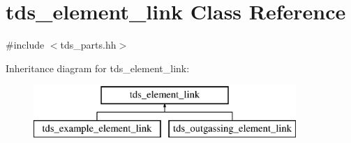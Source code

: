 \hypertarget{classtds__element__link}{\section{tds\-\_\-element\-\_\-link Class Reference}
\label{classtds__element__link}
}


{\ttfamily \#include $<$tds\-\_\-parts.\-hh$>$}

Inheritance diagram for tds\-\_\-element\-\_\-link\-:\begin{figure}[H]
\begin{center}
\leavevmode
\includegraphics[height=2.000000cm]{classtds__element__link}
\end{center}
\end{figure}
